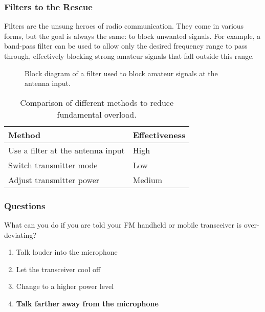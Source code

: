 \subsubsection*{Filters to the Rescue}

Filters are the unsung heroes of radio communication. They come in various forms, but the goal is always the same: to block unwanted signals. For example, a band-pass filter can be used to allow only the desired frequency range to pass through, effectively blocking strong amateur signals that fall outside this range. 

\begin{figure}[h]
    \centering
    \caption{Block diagram of a filter used to block amateur signals at the antenna input.}
    \label{fig:filter-block}
\end{figure}

\begin{table}[h]
    \centering
    \begin{tabular}{|l|l|}
    \hline
    \textbf{Method} & \textbf{Effectiveness} \\ \hline
    Use a filter at the antenna input & High \\ \hline
    Switch transmitter mode & Low \\ \hline
    Adjust transmitter power & Medium \\ \hline
    \end{tabular}
    \caption{Comparison of different methods to reduce fundamental overload.}
    \label{tab:overload-methods}
\end{table}

\subsubsection*{Questions}

\begin{tcolorbox}[colback=gray!10!white,colframe=black!75!black,title={T7B01}]
    What can you do if you are told your FM handheld or mobile transceiver is over-deviating?
    \begin{enumerate}[label=\Alph*),noitemsep]
        \item Talk louder into the microphone
        \item Let the transceiver cool off
        \item Change to a higher power level
        \item \textbf{Talk farther away from the microphone}
    \end{enumerate}
\end{tcolorbox}

